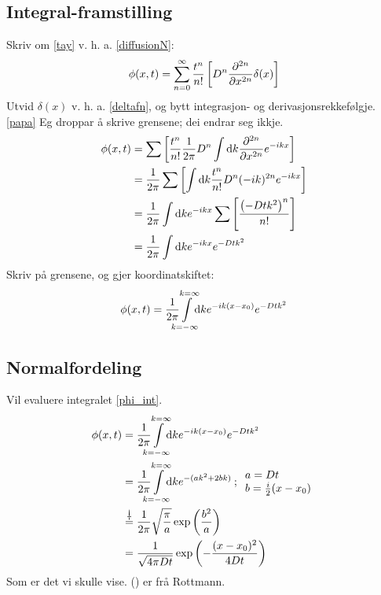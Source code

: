 \documentclass[12pt]{article}
\begin{document}
\begin{multicols*}{2}
    \subsection*{Integral-framstilling}
    Skriv om \eqref{tay} v. h. a. \eqref{diffusionN}:
    \[
        \phi(x, t) = \sum_{n = 0}^\infty
        \frac{t^n}{n!} \left[ D^n \frac{\partial^{2n} }{\partial x ^{2n}} \delta(x) \right]
    \]
    Utvid $\delta(x)$ v. h. a. \eqref{deltafn},
    og bytt integrasjon- og derivasjonsrekkefølgje. \eqref{papa}
    Eg droppar å skrive grensene; dei endrar seg ikkje.
    \begin{align*}
        \phi(x, t) &= \sum \left[
        \frac{t^n}{n!} \frac{1}{2\pi} D^n \int
    \mathrm{d} k \frac{\partial^{2n} }{\partial x ^{2n}} e^{-ikx} \right] \\
                   &= \frac{1}{2\pi} \sum \left[ \int \mathrm{d} k \frac{t^n}{n!} D^n (-ik)^{2n} e^{-ikx} \right] \\
                   &= \frac{1}{2\pi} \int \mathrm{d} k e^{-ikx} \sum \left[ \frac{\left(-Dtk^2\right)^n}{n!} \right]\\
                   &= \frac{1}{2\pi} \int \mathrm{d} k e^{-ikx} e^{-Dtk^2}
    \end{align*}
    Skriv på grensene, og gjer koordinatskiftet:
    \begin{equation}
        \phi(x, t) = \frac{1}{2\pi}
        \smashoperator{\int\limits_{k = -\infty}^{k = \infty}}
                \D k e^{-ik(x - x_0)} e^{-Dtk^2}
        \label{phi_int}
    \end{equation}

    \subsection*{Normalfordeling}
    Vil evaluere integralet \eqref{phi_int}.
    \begin{align}
    \begin{split}
        \phi(x, t) &= \frac{1}{2\pi}
        \smashoperator{\int\limits_{k = -\infty}^{k = \infty}}
                \D k e^{-ik(x - x_0)} e^{-Dtk^2} \\
                   &= \frac{1}{2\pi}
        \smashoperator{\int\limits_{k = -\infty}^{k = \infty}}
        \D k e^{-(ak^2 + 2bk)} \:\text;\:
        \begin{array}{l} a = Dt \\  b = \frac{i}{2}(x - x_0) \end{array} \\
                   &\stackrel{\satan}{=} \frac{1}{2\pi} \sqrt{\frac{\pi}{a}} \exp \left(\frac{b^2}{a} \right) \\
                   &= \frac{1}{\sqrt{4\pi D t}} \exp \left( -\frac{(x - x_0)^2}{4 D t} \right)
    \end{split}\label{gauss}
    \end{align}
    Som er det vi skulle vise. (\satan) er frå Rottmann.


\end{multicols*}
\end{document}
